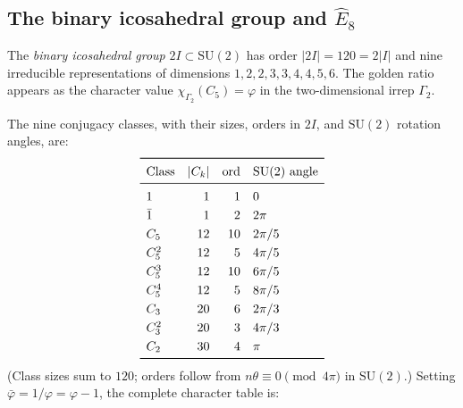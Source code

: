 \documentclass[11pt,a4paper]{article}
\theoremstyle{definition}
\theoremstyle{remark}
\newcommand{\vp}{\varphi}
\begin{document}
\subsection{The binary icosahedral group and $\hat{E}_8$}

The \emph{binary icosahedral group} $2I \subset \mathrm{SU}(2)$ has order
$|2I|=120=2|I|$ and nine irreducible representations of dimensions
$1,2,2,3,3,4,4,5,6$.  The golden ratio appears as the character value
$\chi_{\Gamma_{2}}(C_{5}) = \vp$ in the two-dimensional irrep $\Gamma_2$.

The nine conjugacy classes, with their sizes, orders in $2I$, and
$\mathrm{SU}(2)$ rotation angles, are:
\begin{equation}
\renewcommand{\arraystretch}{1.25}
\begin{array}{lrrl}
\toprule
\text{Class} & |C_k| & \text{ord} & \text{SU}(2)\text{ angle}\\
\midrule
1       & 1  & 1  & 0 \\
\bar{1} & 1  & 2  & 2\pi \\
C_5     & 12 & 10 & 2\pi/5 \\
C_5^2   & 12 & 5  & 4\pi/5 \\
C_5^3   & 12 & 10 & 6\pi/5 \\
C_5^4   & 12 & 5  & 8\pi/5 \\
C_3     & 20 & 6  & 2\pi/3 \\
C_3^2   & 20 & 3  & 4\pi/3 \\
C_2     & 30 & 4  & \pi    \\
\bottomrule
\end{array}
\label{P1:eq:classes}
\end{equation}
(Class sizes sum to $120$; orders follow from $n\theta\equiv 0\pmod{4\pi}$
in $\mathrm{SU}(2)$.)  Setting $\bar\vp = 1/\vp = \vp-1$, the complete
character table is:
\end{document}
